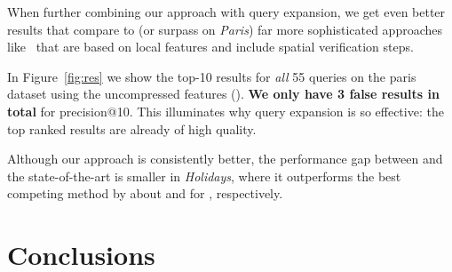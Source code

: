 \documentclass[runningheads]{llncs}
\begin{document}
When further combining our approach with query expansion, we get even better results that compare to (or surpass on \emph{Paris}) far more sophisticated approaches like~\cite{MPCM10,CMPM11,ToJA15} that are based on local features and include spatial verification steps.

In Figure~\ref{fig:res} we show the top-10 results for \textit{all} 55 queries on the paris dataset using the uncompressed \Crow features (). \textbf{We only have 3 false results in total} for precision@10. This illuminates why query expansion is so effective: the top ranked results are already of high quality.

Although our approach is consistently better, the performance gap between \Crow and the state-of-the-art is smaller in \emph{Holidays}, where it outperforms the best competing method by about  and  for , respectively.

































































 



 \section{Conclusions}
\label{sec:conclusions}
\end{document}
